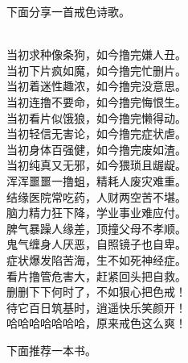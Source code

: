 下面分享一首戒色诗歌。

\begin{poem}[戒色诗]
    \begin{multicols}{2}
        \centering~\\
        当初求种像条狗，如今撸完嫌人丑。 \\ 当初下片疯如魔，如今撸完忙删片。 \\ 当初着迷性趣浓，如今撸完没意思。 \\ 当初连撸不要命，如今撸完悔恨生。 \\ 当初看片似饿狼，如今撸完懒得动。 \\ 当初轻信无害论，如今撸完症状虐。 \\ 当初身体百强健，如今撸完废如渣。 \\ 当初纯真又无邪，如今猥琐且龌龊。 \\ 浑浑噩噩一撸蛆，精耗人废灾难重。 \\ 结缘医院常吃药，人财两空苦不堪。 \\ 脑力精力狂下降，学业事业难应付。 \\ 脾气暴躁人缘差，顶撞父母不孝顺。 \\ 鬼气缠身人厌恶，自照镜子也自卑。 \\ 症状爆发陷苦海，生不如死神经症。 \\ 看片撸管危害大，赶紧回头把自救。 \\ 删删下下何时了，不如狠心把色戒！ \\ 待它百日筑基时，逍遥快乐笑颜开！ \\ 哈哈哈哈哈哈哈，原来戒色这么爽！
    \end{multicols}
\end{poem}

下面推荐一本书。

